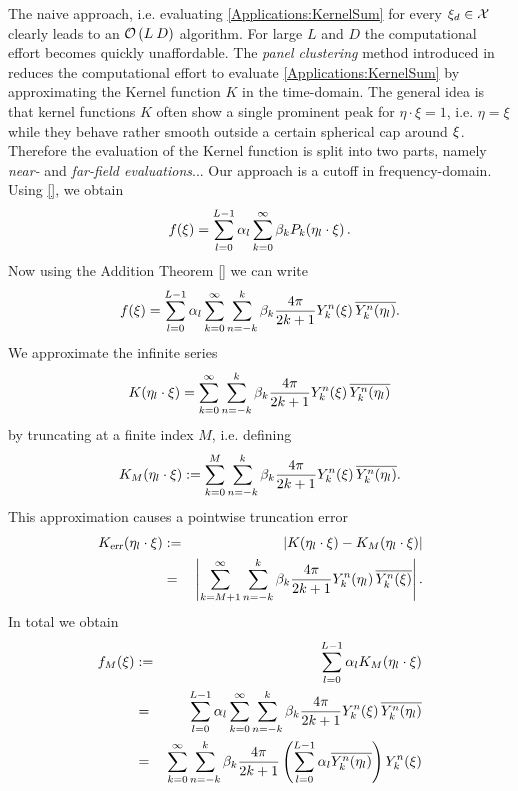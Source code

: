 The naive approach, i.e. evaluating \ref{Applications:KernelSum} for every $\mathbf{\xi}_{d} \in \mathcal{X}$ clearly leads to an $\mathcal{O}\left(L\:D\right)$ algorithm. For large $L$ and $D$ the computational effort becomes quickly unaffordable.
The \emph{panel clustering} method introduced in \cite{FrGlSch98} reduces the computational effort to evaluate \ref{Applications:KernelSum} by approximating the Kernel function $K$ in the time-domain. The general idea is that kernel functions $K$ often show a single prominent peak for $\eta \cdot \xi = 1$, i.e. $\eta = \xi$ while they behave rather smooth outside a certain spherical cap around $\mathbf{\xi}$. Therefore the evaluation of the Kernel function is split into two parts, namely \emph{near-} and \emph{far-field evaluations}...
Our approach is a cutoff in frequency-domain. Using \ref{}, we obtain
$$
  f{\hspace{-0.4ex}}\left(\xi\right) = \sum_{l = 0}^{L-1} \alpha_{l} \sum_{k=0}^{\infty} \beta_{k} P_k{\hspace{-0.4ex}}\left(\mathbf{\eta}_{l} \cdot \mathbf{\xi}\right).
$$
Now using the Addition Theorem \ref{} we can write
\begin{equation}
  f{\hspace{-0.4ex}}\left(\xi\right) = \sum_{l = 0}^{L-1} \alpha_{l} \sum_{k=0}^{\infty} \sum_{n=-k}^k \beta_{k} \frac{4\pi}{2k+1} Y_{k}^n{\hspace{-0.4ex}}\left(\mathbf{\xi}\right) \overline{Y_{k}^n{\hspace{-0.4ex}}\left(\mathbf{\eta}_{l}\right)}.
\end{equation}
We approximate the infinite series
$$
  K{\hspace{-0.4ex}}\left(\mathbf{\eta}_{l} \cdot \mathbf{\xi}\right) = \sum_{k=0}^{\infty} \sum_{n=-k}^k \beta_{k} \frac{4\pi}{2k+1} Y_{k}^n{\hspace{-0.4ex}}\left(\mathbf{\xi}\right) \overline{Y_{k}^n{\hspace{-0.4ex}}\left(\mathbf{\eta}_{l}\right)}
$$
by truncating at a finite index $M$, i.e. defining
$$
  K_{M}{\hspace{-0.4ex}}\left(\mathbf{\eta}_{l} \cdot \mathbf{\xi}\right) := 
  \sum_{k=0}^{M} \sum_{n=-k}^k \beta_{k} \frac{4\pi}{2k+1} Y_{k}^n{\hspace{-0.4ex}}\left(\mathbf{\xi}\right) \overline{Y_{k}^n{\hspace{-0.4ex}}\left(\mathbf{\eta}_{l}\right)}.
$$
This approximation causes a pointwise truncation error 
\begin{eqnarray*}
  K_{\text{\textsl{err}}}{\hspace{-0.4ex}}\left(\mathbf{\eta}_{l} \cdot \mathbf{\xi}\right) 
    & := & \left\vert K{\hspace{-0.4ex}}\left(\mathbf{\eta}_{l} \cdot \mathbf{\xi}\right) - K_{M}{\hspace{-0.4ex}}\left(\mathbf{\eta}_{l} \cdot \mathbf{\xi}\right)\right\vert\\
    &  = & \left\vert\sum_{k=M+1}^{\infty} \sum_{n=-k}^k \beta_{k} \frac{4\pi}{2k+1} Y_{k}^n{\hspace{-0.4ex}}\left(\mathbf{\eta}_{l}\right) \overline{Y_{k}^n{\hspace{-0.4ex}}\left(\mathbf{\xi}\right)}\right\vert.
\end{eqnarray*}
In total we obtain
\begin{eqnarray}
  f_{M}{\hspace{-0.4ex}}\left(\xi\right) & := & \sum_{l=0}^{L-1} \alpha_{l} K_{M}{\hspace{-0.4ex}}\left(\mathbf{\eta}_{l} \cdot \mathbf{\xi}\right) \\
                   &  = & \sum_{l = 0}^{L-1} \alpha_{l} \sum_{k=0}^{\infty} \sum_{n=-k}^k \beta_{k} \frac{4\pi}{2k+1} 
                           Y_{k}^n{\hspace{-0.4ex}}\left(\mathbf{\xi}\right) \overline{Y_{k}^n{\hspace{-0.4ex}}\left(\mathbf{\eta}_{l}\right)} \\
                   &  = & \sum_{k=0}^{\infty} \sum_{n=-k}^k \beta_{k} \frac{4\pi}{2k+1} \left(\sum_{l = 0}^{L-1} 
                           \alpha_{l} \overline{Y_{k}^n{\hspace{-0.4ex}}\left(\mathbf{\eta}_{l}\right)}\right) Y_{k}^n{\hspace{-0.4ex}}\left(\mathbf{\xi}\right)
\end{eqnarray}
